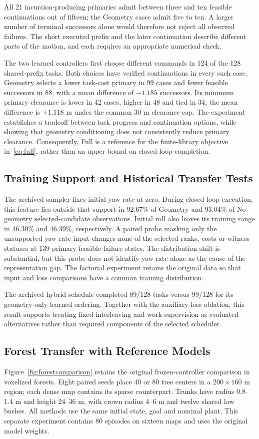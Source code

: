 \documentclass[journal]{IEEEtran}
\begin{document}
All 21 incursion-producing primaries admit between three and ten feasible continuations out of fifteen; the Geometry cases admit five to ten. A larger number of terminal successors alone would therefore not reject all observed failures. The short executed prefix and the later continuation describe different parts of the motion, and each requires an appropriate numerical check.

The two learned controllers first choose different commands in 124 of the 128 shared-prefix tasks. Both choices have verified continuations in every such case. Geometry selects a lower task-cost primary in 99 cases and fewer feasible successors in 88, with a mean difference of $-1.185$ successors. Its minimum primary clearance is lower in 42 cases, higher in 48 and tied in 34; the mean difference is $+1.118$ m under the common 30 m clearance cap. The experiment establishes a tradeoff between task progress and continuation options, while showing that geometry conditioning does not consistently reduce primary clearance. Consequently, Full is a reference for the finite-library objective in~\eqref{eq:full}, rather than an upper bound on closed-loop completion.

\subsection{Training Support and Historical Transfer Tests}
The archived sampler fixes initial yaw rate at zero. During closed-loop execution, this feature lies outside that support in 92.67\% of Geometry and 93.04\% of No-geometry selected-candidate observations. Initial roll also leaves its training range in 46.30\% and 46.39\%, respectively. A paired probe masking only the unsupported yaw-rate input changes none of the selected ranks, costs or witness statuses at 139 primary-feasible failure states. The distribution shift is substantial, but this probe does not identify yaw rate alone as the cause of the representation gap. The factorial experiment retains the original data so that input and loss comparisons have a common training distribution.

The archived hybrid schedule completed 89/128 tasks versus 99/128 for its geometry-only learned ordering. Together with the auxiliary-loss ablation, this result supports treating fixed interleaving and work supervision as evaluated alternatives rather than required components of the selected scheduler.

\subsection{Forest Transfer with Reference Models}
Figure~\ref{fig:forestcomparison} retains the original frozen-controller comparison in voxelized forests. Eight paired seeds place 40 or 80 tree centers in a $200\times160$ m region; each dense map contains its sparse counterpart. Trunks have radius 0.8--1.4 m and height 24--36 m, with crown radius 4--6 m and twelve shared low bushes. All methods use the same initial state, goal and nominal plant. This separate experiment contains 80 episodes on sixteen maps and uses the original model weights.
\end{document}
